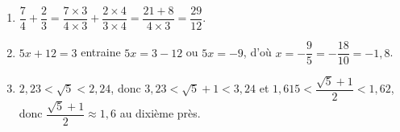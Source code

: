 
\medskip
		
%
\begin{enumerate}
\item $\dfrac{7}{4} + \dfrac{2}{3} = \dfrac{7\times 3}{4\times 3} + \dfrac{2\times 4}{3\times 4} = \dfrac{21 + 8}{4\times 3} = \dfrac{29}{12}$.
\item $5x + 12 = 3$ entraine $5x = 3 - 12$ ou $5x = - 9$, d'où $x = - \dfrac{9}{5} = - \dfrac{18}{10} = - 1,8$.
\item $2,23 < \sqrt{5} < 2,24$, donc $3,23 < \sqrt{5} + 1 < 3,24$ et $1,615 < \dfrac{\sqrt{5} + 1}{2}< 1,62$, donc $\dfrac{\sqrt{5} + 1}{2} \approx 1,6$ au dixième près.
\end{enumerate}
		
\vspace{0,5cm}

